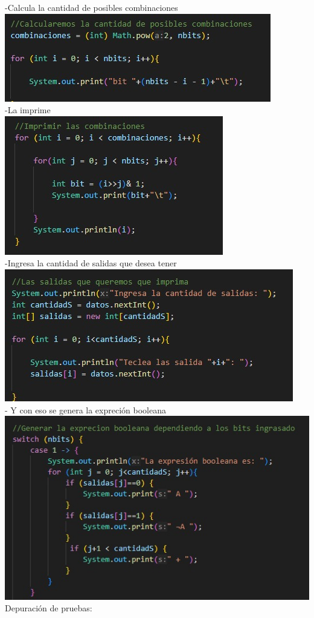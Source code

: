 \documentclass{IEEEcsmag}
\begin{document}
\begin{enumerate}
    
    -Calcula la cantidad de posibles combinaciones \\
    \centering
    \includegraphics[width=0.5\linewidth]{./latex_imagenes/Img_ejer6_2.jpg}  \\
    -La imprime \\
    \centering
    \includegraphics[width=0.5\linewidth]{./latex_imagenes/Img_ejer6_3.jpg}  \\
    -Ingresa la cantidad de salidas que desea tener
    \centering
    \includegraphics[width=0.5\linewidth]{./latex_imagenes/Img_ejer6_4.jpg}  \\
    - Y con eso se genera la expreción booleana
    \centering
    \includegraphics[width=0.5\linewidth]{./latex_imagenes/Img_ejer6_5.jpg}  \\
    

    Depuración de pruebas:


\end{enumerate}
\end{document}
